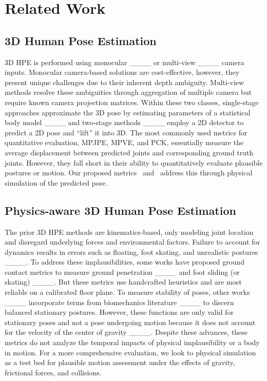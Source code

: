 \section{Related Work}
\subsection*{3D Human Pose Estimation}
3D HPE is performed using monocular ____ or multi-view ____ camera inputs.
Monocular camera-based solutions are cost-effective, however, they present unique challenges due to their inherent depth ambiguity.
Multi-view methods resolve these ambiguities through aggregation of multiple camera but require known camera projection matrices.
%
Within these two classes, single-stage approaches approximate the 3D pose by estimating parameters of a statistical body model ____ and two-stage methods ____ employ a 2D detector to predict a 2D pose and ``lift'' it into 3D.
%
The most commonly used metrics for quantitative evaluation, MPJPE, MPVE, and PCK, essentially measure the average displacement between predicted joints and corresponding ground truth joints. 
However, they fall short in their ability to quantitatively evaluate plausible postures or motion. Our proposed metrics \metricOne\ and \metricTwo\ address this through physical simulation of the predicted pose.

\subsection*{Physics-aware 3D Human Pose Estimation}
The prior 3D HPE methods are kinematics-based, only modeling joint location and disregard underlying forces and environmental factors. 
Failure to account for dynamics results in errors such as floating, foot skating, and unrealistic postures ____.
To address these implausibilities, some works have proposed ground contact metrics to measure ground penetration ____ and foot sliding (or skating) ____.
But these metrics use handcrafted heuristics and are most reliable on a calibrated floor plane.
To measure stability of poses, other works ____ incorporate terms from biomechanics literature ____ to discern balanced stationary postures.
However, these functions are only valid for stationary poses and not a pose undergoing motion because it does not account for the velocity of the center of gravity ____.
Despite these advances, these metrics do not analyze the temporal impacts of physical implausibility or a body in motion. For a more comprehensive evaluation, we look to physical simulation as a test bed for plausible motion assessment under the effects of gravity, frictional forces, and collisions.